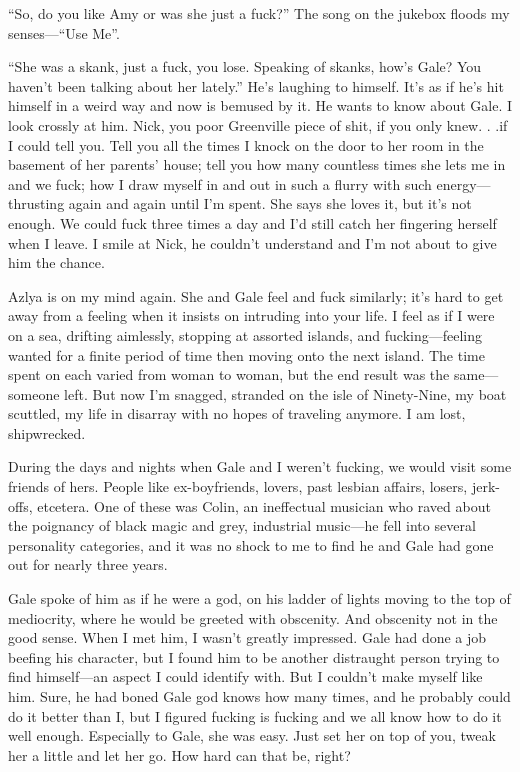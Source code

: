 ``So, do you like Amy or was she just a fuck?'' The song on the jukebox
floods my senses---``Use Me''.

``She was a skank, just a fuck, you lose. Speaking of skanks, how's
Gale? You haven't been talking about her lately.'' He's laughing to
himself. It's as if he's hit himself in a weird way and now is bemused
by it. He wants to know about Gale. I look crossly at him. Nick, you
poor Greenville piece of shit, if you only knew. . .if I could tell you.
Tell you all the times I knock on the door to her room in the basement
of her parents' house; tell you how many countless times she lets me in
and we fuck; how I draw myself in and out in such a flurry with such
energy---thrusting again and again until I'm spent. She says she loves
it, but it's not enough. We could fuck three times a day and I'd still
catch her fingering herself when I leave. I smile at Nick, he couldn't
understand and I'm not about to give him the chance.

Azlya is on my mind again. She and Gale feel and fuck similarly; it's
hard to get away from a feeling when it insists on intruding into your
life. I feel as if I were on a sea, drifting aimlessly, stopping at
assorted islands, and fucking---feeling wanted for a finite period of
time then moving onto the next island. The time spent on each varied
from woman to woman, but the end result was the same---someone left. But
now I'm snagged, stranded on the isle of Ninety-Nine, my boat scuttled,
my life in disarray with no hopes of traveling anymore. I am lost,
shipwrecked.

During the days and nights when Gale and I weren't fucking, we would
visit some friends of hers. People like ex-boyfriends, lovers, past
lesbian affairs, losers, jerk-offs, etcetera. One of these was Colin, an
ineffectual musician who raved about the poignancy of black magic and
grey, industrial music---he fell into several personality categories,
and it was no shock to me to find he and Gale had gone out for nearly
three years.

Gale spoke of him as if he were a god, on his ladder of lights moving to
the top of mediocrity, where he would be greeted with obscenity. And
obscenity not in the good sense. When I met him, I wasn't greatly
impressed. Gale had done a job beefing his character, but I found him to
be another distraught person trying to find himself---an aspect I could
identify with. But I couldn't make myself like him. Sure, he had boned
Gale god knows how many times, and he probably could do it better than
I, but I figured fucking is fucking and we all know how to do it well
enough. Especially to Gale, she was easy. Just set her on top of you,
tweak her a little and let her go. How hard can that be, right?

